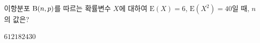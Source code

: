 이항분포 $\mathrm{B}(n{,}\mkern3mu\mathopen{}p)$를 따르는 확률변수 $X$에 대하여 $\mathrm{E}(X)=6$, $\mathrm{E}(X^2)=40$일 때, $n$의 값은?
\begin{choices32}{$6$}{$12$}{$18$}{$24$}{$30$}\end{choices32}
